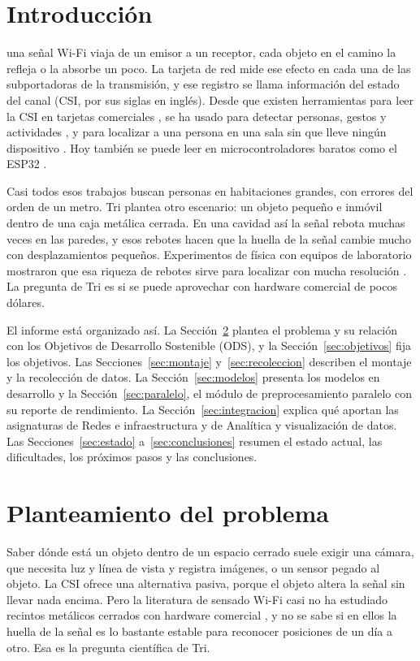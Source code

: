 \documentclass[10pt,journal]{IEEEtran}
\begin{document}
\section{Introducción}
 una señal Wi-Fi viaja de un emisor a un receptor, cada objeto en el camino la refleja o la absorbe un poco. La tarjeta de red mide ese efecto en cada una de las subportadoras de la transmisión, y ese registro se llama información del estado del canal (CSI, por sus siglas en inglés). Desde que existen herramientas para leer la CSI en tarjetas comerciales \cite{halperin2011tool}, se ha usado para detectar personas, gestos y actividades \cite{ma2019wifi}, y para localizar a una persona en una sala sin que lleve ningún dispositivo \cite{xiao2013pilot,dang2019device}. Hoy también se puede leer en microcontroladores baratos como el ESP32 \cite{hernandez2020lightweight}.

Casi todos esos trabajos buscan personas en habitaciones grandes, con errores del orden de un metro. Tri plantea otro escenario: un objeto pequeño e inmóvil dentro de una caja metálica cerrada. En una cavidad así la señal rebota muchas veces en las paredes, y esos rebotes hacen que la huella de la señal cambie mucho con desplazamientos pequeños. Experimentos de física con equipos de laboratorio mostraron que esa riqueza de rebotes sirve para localizar con mucha resolución \cite{delhougne2021deeply}. La pregunta de Tri es si se puede aprovechar con hardware comercial de pocos dólares.

El informe está organizado así. La Sección~\ref{sec:problema} plantea el problema y su relación con los Objetivos de Desarrollo Sostenible (ODS), y la Sección~\ref{sec:objetivos} fija los objetivos. Las Secciones~\ref{sec:montaje} y~\ref{sec:recoleccion} describen el montaje y la recolección de datos. La Sección~\ref{sec:modelos} presenta los modelos en desarrollo y la Sección~\ref{sec:paralelo}, el módulo de preprocesamiento paralelo con su reporte de rendimiento. La Sección~\ref{sec:integracion} explica qué aportan las asignaturas de Redes e infraestructura y de Analítica y visualización de datos. Las Secciones~\ref{sec:estado} a~\ref{sec:conclusiones} resumen el estado actual, las dificultades, los próximos pasos y las conclusiones.

\section{Planteamiento del problema}\label{sec:problema}
Saber dónde está un objeto dentro de un espacio cerrado suele exigir una cámara, que necesita luz y línea de vista y registra imágenes, o un sensor pegado al objeto. La CSI ofrece una alternativa pasiva, porque el objeto altera la señal sin llevar nada encima. Pero la literatura de sensado Wi-Fi casi no ha estudiado recintos metálicos cerrados con hardware comercial \cite{ma2019wifi}, y no se sabe si en ellos la huella de la señal es lo bastante estable para reconocer posiciones de un día a otro. Esa es la pregunta científica de Tri.
\end{document}
